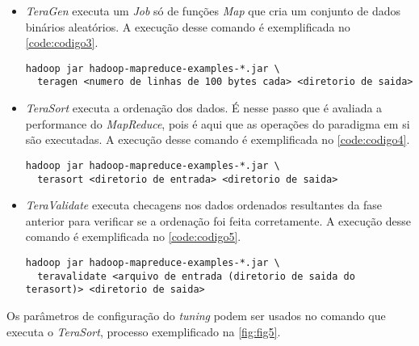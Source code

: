 \begin{itemize}
  \item \textit{TeraGen} executa um \textit{Job} só de funções \textit{Map} que cria um conjunto de dados binários aleatórios. A execução desse comando é exemplificada no \autoref{code:codigo3}.
  
  \begin{lstlisting}[caption={Exemplo de execução do \textit{TeraGen} adaptado de \cite{HadoopBook15}}, label=code:codigo3]
  hadoop jar hadoop-mapreduce-examples-*.jar \
  teragen <numero de linhas de 100 bytes cada> <diretorio de saida>
  \end{lstlisting}
  
  \item \textit{TeraSort} executa a ordenação dos dados. É nesse passo que é avaliada a performance do \textit{MapReduce}, pois é aqui que as operações do paradigma em si são executadas. A execução desse comando é exemplificada no \autoref{code:codigo4}.
  \begin{lstlisting}[caption={Exemplo de execução do \textit{TeraSort} adaptado de \cite{HadoopBook15}}, label=code:codigo4]
  hadoop jar hadoop-mapreduce-examples-*.jar \
  terasort <diretorio de entrada> <diretorio de saida>
  \end{lstlisting}  

  \item \textit{TeraValidate} executa checagens nos dados ordenados resultantes da fase anterior para verificar se a ordenação foi feita corretamente. A execução desse comando é exemplificada no \autoref{code:codigo5}.
  \begin{lstlisting}[caption={Exemplo de execução do \textit{TeraValidate} adaptado de \cite{HadoopBook15}}, label=code:codigo5]
  hadoop jar hadoop-mapreduce-examples-*.jar \
  teravalidate <arquivo de entrada (diretorio de saida do terasort)> <diretorio de saida>
  \end{lstlisting}

\end{itemize}

Os parâmetros de configuração do \textit{tuning} podem ser usados no comando que executa o \textit{TeraSort}, processo exemplificado na \autoref{fig:fig5}.



